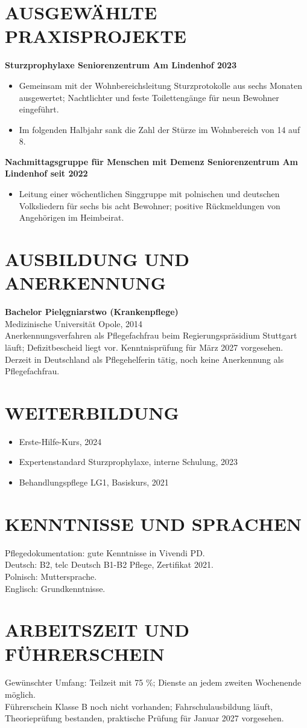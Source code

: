 \documentclass[11pt,a4paper]{article}
\newcommand{\cvsection}[1]{\section*{#1}}
\begin{document}
\newpage
\cvsection{AUSGEWÄHLTE PRAXISPROJEKTE}
\textbf{Sturzprophylaxe \textbar{} Seniorenzentrum Am Lindenhof \textbar{} 2023}
\begin{itemize}
\item Gemeinsam mit der Wohnbereichsleitung Sturzprotokolle aus sechs Monaten ausgewertet; Nachtlichter und feste Toilettengänge für neun Bewohner eingeführt.
\item Im folgenden Halbjahr sank die Zahl der Stürze im Wohnbereich von 14 auf 8.
\end{itemize}

\textbf{Nachmittagsgruppe für Menschen mit Demenz \textbar{} Seniorenzentrum Am Lindenhof \textbar{} seit 2022}
\begin{itemize}
\item Leitung einer wöchentlichen Singgruppe mit polnischen und deutschen Volksliedern für sechs bis acht Bewohner; positive Rückmeldungen von Angehörigen im Heimbeirat.
\end{itemize}

\cvsection{AUSBILDUNG UND ANERKENNUNG}
\textbf{Bachelor Pielęgniarstwo (Krankenpflege)}\\
Medizinische Universität Opole, 2014\\
Anerkennungsverfahren als Pflegefachfrau beim Regierungspräsidium Stuttgart läuft; Defizitbescheid liegt vor. Kenntnisprüfung für März 2027 vorgesehen. Derzeit in Deutschland als Pflegehelferin tätig, noch keine Anerkennung als Pflegefachfrau.

\cvsection{WEITERBILDUNG}
\begin{itemize}
\item Erste-Hilfe-Kurs, 2024
\item Expertenstandard Sturzprophylaxe, interne Schulung, 2023
\item Behandlungspflege LG1, Basiskurs, 2021
\end{itemize}

\cvsection{KENNTNISSE UND SPRACHEN}
Pflegedokumentation: gute Kenntnisse in Vivendi PD.\\
Deutsch: B2, telc Deutsch B1-B2 Pflege, Zertifikat 2021.\\
Polnisch: Muttersprache.\\
Englisch: Grundkenntnisse.

\cvsection{ARBEITSZEIT UND FÜHRERSCHEIN}
Gewünschter Umfang: Teilzeit mit 75 \%; Dienste an jedem zweiten Wochenende möglich.\\
Führerschein Klasse B noch nicht vorhanden; Fahrschulausbildung läuft, Theorieprüfung bestanden, praktische Prüfung für Januar 2027 vorgesehen.
\end{document}
